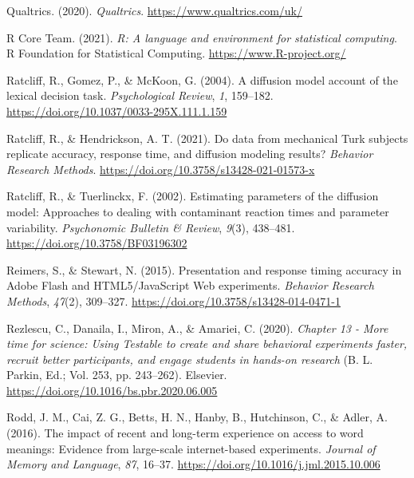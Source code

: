 \documentclass[
  english,
  man,floatsintext]{apa6}
\newlength{\cslhangindent}
\newlength{\cslentryspacingunit} %
\newenvironment{CSLReferences}[2] %
 {%
  \setlength{\parindent}{0pt}
  \ifodd #1
  \let\oldpar\par
  \def\par{\hangindent=\cslhangindent\oldpar}
  \fi
  \setlength{\parskip}{#2\cslentryspacingunit}
 }%
 {}
\begin{document}
\begin{CSLReferences}{1}{0}
\leavevmode{}%
Qualtrics. (2020). \emph{Qualtrics}. \url{https://www.qualtrics.com/uk/}

\leavevmode{}%
R Core Team. (2021). \emph{R: A language and environment for statistical computing}. R Foundation for Statistical Computing. \url{https://www.R-project.org/}

\leavevmode{}%
Ratcliff, R., Gomez, P., \& McKoon, G. (2004). A diffusion model account of the lexical decision task. \emph{Psychological Review}, \emph{1}, 159--182. \url{https://doi.org/10.1037/0033-295X.111.1.159}

\leavevmode{}%
Ratcliff, R., \& Hendrickson, A. T. (2021). Do data from mechanical Turk subjects replicate accuracy, response time, and diffusion modeling results? \emph{Behavior Research Methods}. \url{https://doi.org/10.3758/s13428-021-01573-x}

\leavevmode{}%
Ratcliff, R., \& Tuerlinckx, F. (2002). Estimating parameters of the diffusion model: Approaches to dealing with contaminant reaction times and parameter variability. \emph{Psychonomic Bulletin \& Review}, \emph{9}(3), 438--481. \url{https://doi.org/10.3758/BF03196302}

\leavevmode{}%
Reimers, S., \& Stewart, N. (2015). Presentation and response timing accuracy in {Adobe Flash} and {HTML5}/{JavaScript Web} experiments. \emph{Behavior Research Methods}, \emph{47}(2), 309--327. \url{https://doi.org/10.3758/s13428-014-0471-1}

\leavevmode{}%
Rezlescu, C., Danaila, I., Miron, A., \& Amariei, C. (2020). \emph{Chapter 13 - More time for science: Using Testable to create and share behavioral experiments faster, recruit better participants, and engage students in hands-on research} (B. L. Parkin, Ed.; Vol. 253, pp. 243--262). Elsevier. \url{https://doi.org/10.1016/bs.pbr.2020.06.005}

\leavevmode{}%
Rodd, J. M., Cai, Z. G., Betts, H. N., Hanby, B., Hutchinson, C., \& Adler, A. (2016). The impact of recent and long-term experience on access to word meanings: Evidence from large-scale internet-based experiments. \emph{Journal of Memory and Language}, \emph{87}, 16--37. \url{https://doi.org/10.1016/j.jml.2015.10.006}


\end{CSLReferences}
\end{document}
